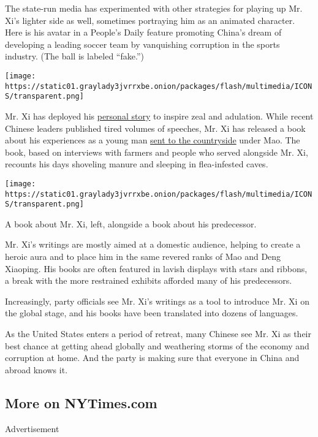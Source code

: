 The state-run media has experimented with other strategies for playing
up Mr. Xi's lighter side as well, sometimes portraying him as an
animated character. Here is his avatar in a People's Daily feature
promoting China's dream of developing a leading soccer team by
vanquishing corruption in the sports industry. (The ball is labeled
``fake.'')

\texttt{[image: https://static01.graylady3jvrrxbe.onion/packages/flash/multimedia/ICONS/transparent.png]}

Mr. Xi has deployed his
\href{https://www.nytimes3xbfgragh.onion/2017/10/08/world/asia/xi-jinping-china-propaganda-village.html}{personal
story} to inspire zeal and adulation. While recent Chinese leaders
published tired volumes of speeches, Mr. Xi has released a book about
his experiences as a young man
\href{https://www.nytimes3xbfgragh.onion/2017/10/08/world/asia/xi-jinping-china-propaganda-village.html?_r=0}{sent
to the countryside} under Mao. The book, based on interviews with
farmers and people who served alongside Mr. Xi, recounts his days
shoveling manure and sleeping in flea-infested caves.

\texttt{[image: https://static01.graylady3jvrrxbe.onion/packages/flash/multimedia/ICONS/transparent.png]}

A book about Mr. Xi, left, alongside a book about his predecessor.

Mr. Xi's writings are mostly aimed at a domestic audience, helping to
create a heroic aura and to place him in the same revered ranks of Mao
and Deng Xiaoping. His books are often featured in lavish displays with
stars and ribbons, a break with the more restrained exhibits afforded
many of his predecessors.

Increasingly, party officials see Mr. Xi's writings as a tool to
introduce Mr. Xi on the global stage, and his books have been translated
into dozens of languages.

As the United States enters a period of retreat, many Chinese see Mr. Xi
as their best chance at getting ahead globally and weathering storms of
the economy and corruption at home. And the party is making sure that
everyone in China and abroad knows it.

\hypertarget{more-on-nytimescom}{%
\subsection{More on NYTimes.com}\label{more-on-nytimescom}}

Advertisement

